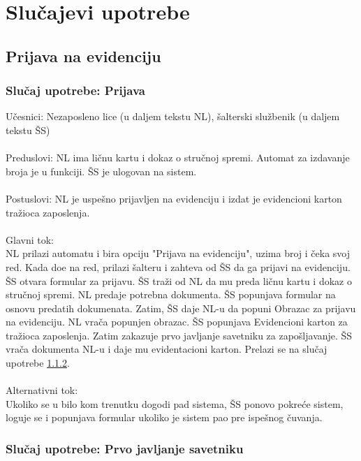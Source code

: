 \section{Slu\v cajevi upotrebe}

\subsection{Prijava na evidenciju}


\subsubsection{Slu\v caj upotrebe: Prijava}

\noindent U\v cesnici: Nezaposleno lice (u daljem tekstu NL), \v salterski slu\v zbenik (u daljem tekstu \v SS)
\\
\\ Preduslovi: NL ima li\v cnu kartu i dokaz o stru\v cnoj spremi. Automat za izdavanje broja je u funkciji. \v SS je ulogovan na sistem. 
\\
\\ Postuslovi: NL je uspe\v sno prijavljen na evidenciju i izdat je evidencioni karton tra\v zioca zaposlenja.
\\
\\ Glavni tok:
\\ NL prilazi automatu i bira opciju "Prijava na evidenciju", uzima broj i \v ceka svoj red. Kada do\dj e na red, prilazi \v salteru i zahteva od \v SS da ga prijavi na evidenciju. \v SS otvara formular za prijavu. \v SS tra\v zi od NL da mu preda li\v cnu kartu i dokaz o stru\v cnoj spremi. NL predaje potrebna dokumenta. \v SS popunjava formular na osnovu predatih dokumenata. Zatim, \v SS daje NL-u da popuni Obrazac za prijavu na evidenciju. NL vra\v ca popunjen obrazac. \v SS popunjava Evidencioni karton za tra\v zioca zaposlenja. Zatim zakazuje prvo javljanje savetniku za zapo\v sljavanje. \v SS vra\v ca dokumenta NL-u i daje mu evidentacioni karton. Prelazi se na slu\v caj upotrebe \ref{su: prvo javljanje savetniku}.
\\
\\ Alternativni tok: 
\\ Ukoliko se u bilo kom trenutku dogodi pad sistema, \v SS ponovo pokre\'ce sistem, loguje se i popunjava formular ukoliko je sistem pao pre ispe\v snog \v cuvanja.


\subsubsection{Slu\v caj upotrebe: Prvo javljanje savetniku}
\label{su: prvo javljanje savetniku}

